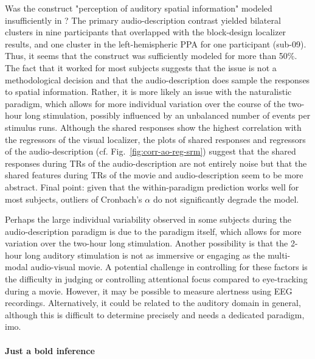 %
Was the construct "perception of auditory spatial information" modeled
insufficiently in \citet{haeusler2022processing}?
%
The primary audio-description contrast yielded bilateral clusters in nine
participants that overlapped with the block-design localizer results, and one
cluster in the left-hemispheric PPA for one participant (sub-09). Thus, it seems
that the construct was sufficiently modeled for more than 50\%.
%
The fact that it worked for most subjects suggests that the issue is not a
methodological decision and that the audio-description does sample the responses
to spatial information.
%
Rather, it is more likely an issue with the naturalistic paradigm, which allows
for more individual variation over the course of the two-hour long stimulation,
possibly influenced by an unbalanced number of events per stimulus runs.
%
Although the shared responses show the highest correlation with the regressors
of the visual localizer, the plots of shared responses and regressors of the
audio-description (cf. Fig.~\ref{fig:corr-ao-reg-srm}) suggest that the shared
responses during TRs of the audio-description are not entirely noise but that
the shared features during TRs of the movie and audio-description seem to be
more abstract.
%
Final point: given that the within-paradigm prediction works well for most
subjects, outliers of Cronbach's $\alpha$ do not significantly degrade the
model.

%
Perhaps the large individual variability observed in some subjects during the
audio-description paradigm is due to the paradigm itself, which allows for more
variation over the two-hour long stimulation.
%
Another possibility is that the 2-hour long auditory stimulation is not as
immersive or engaging as the multi-modal audio-visual movie.
%
A potential challenge in controlling for these factors is the difficulty in
judging or controlling attentional focus compared to eye-tracking during a
movie.
%
However, it may be possible to measure alertness using EEG recordings.
%
Alternatively, it could be related to the auditory domain in general, although
this is difficult to determine precisely and needs a dedicated paradigm, imo.


\paragraph{Just a bold inference}


